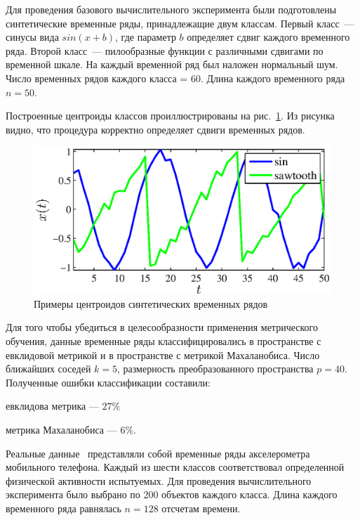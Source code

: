 	Для проведения базового вычислительного эксперимента были подготовлены синтетические временные ряды, принадлежащие двум классам.
	Первый класс~--- синусы вида $sin(x + b)$, где параметр $b$ определяет сдвиг каждого временного ряда.
	Второй класс~--- пилообразные функции с различными сдвигами по временной шкале.
	На каждый временной ряд был наложен нормальный шум.
	Число временных рядов каждого класса = 60.
	Длина каждого временного ряда $n = 50$.
	
	Построенные центроиды классов проиллюстрированы на рис.~\ref{centroids_synthetic}.
	Из рисунка видно, что процедура корректно определяет сдвиги временных рядов.
	\begin{figure}[ht]
		\centering
		\includegraphics[width=0.45\linewidth]{figs/ch4/centroids_synthetic_noize}
		\caption{Примеры центроидов синтетических временных рядов}
		\label{centroids_synthetic}
	\end{figure}
	
	Для того чтобы убедиться в целесообразности применения метрического обучения, данные
	временные ряды классифицировались в пространстве с евклидовой метрикой и в пространстве с метрикой Махаланобиса.
	Число ближайших соседей $k = 5$, размерность преобразованного пространства $p = 40$.
	Полученные ошибки классификации составили:
	
	евклидова метрика --- $27\%$
	
	метрика Махаланобиса --- $6\%$.
	
	Реальные данные~\cite{wisdm} представляли собой временные ряды акселерометра мобильного телефона.
	Каждый из шести классов соответствовал определенной физической активности испытуемых.
	Для проведения вычислительного эксперимента было выбрано по $200$ объектов каждого класса.
	Длина каждого временного ряда равнялась $n = 128$ отсчетам времени.
	
